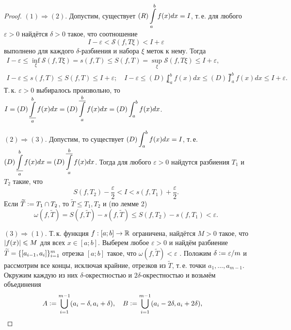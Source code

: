 \begin{proof}
    $(1) \Rightarrow (2)$. Допустим, существует $\displaystyle (R)\int\limits_a^bf(x)dx = I$, т.\,е. для любого $\varepsilon > 0$ найдётся $\delta > 0$ такое, что соотношение
    \[
        I - \varepsilon < \mathcal{S}(f, T\xi) < I + \varepsilon
    \]
    выполнено для каждого $\delta$-разбиения и набора $\xi$ меток к нему. Тогда
    \begin{gather*}
        I - \varepsilon \leqslant \inf\limits_\xi\mathcal{S}(f, T\xi) = s(f, T) \leqslant S(f, T) = \sup\limits_\xi\mathcal{S}(f, T\xi) \leqslant I + \varepsilon,\\
        I - \varepsilon \leqslant s(f, T) \leqslant S(f, T) \leqslant I + \varepsilon;\quad
        I - \varepsilon \leqslant (D)\lowint_a^bf(x)dx \leqslant (D)\upint_a^bf(x)dx \leqslant I + \varepsilon.
    \end{gather*}
    Т.\,к. $\varepsilon > 0$ выбиралось произвольно, то $\displaystyle I = (D)\operatorname*{\underline{\int}}_a^bf(x)dx = (D)\operatorname*{\overline{\int}}_a^bf(x)dx = (D)\int_a^bf(x)dx$.

    $(2) \Rightarrow (3)$. Допустим, то существует $\displaystyle (D)\int_a^bf(x)dx = I$, т.\,е. $\displaystyle (D)\operatorname*{\underline{\int}}_a^bf(x)dx = (D)\operatorname*{\overline{\int}}_a^bf(x)dx$. Тогда для любого $\varepsilon > 0$ найдутся разбиения $T_1$ и $T_2$ такие, что
    \[
        S(f, T_2) - \frac{\varepsilon}{2} < I < s(f, T_1) + \frac{\varepsilon}{2}.
    \]
    Если $\widetilde{T} \vcentcolon = T_1 \cap T_2$, то $\widetilde{T} \leqslant T_1, T_2$ и (по лемме 2)
    \[
        \omega(f, \widetilde{T}) = S(f, \widetilde{T}) - s(f, \widetilde{T}) \leqslant S(f, T_2) - s(f, T_1) < \varepsilon.
    \]

    $(3) \Rightarrow (1)$. Т.\,к. функция $f: [a; b] \to \mathbb{R}$ ограничена, найдётся $M > 0$ такое, что $\left\lvert f(x)\right\rvert \leqslant M$ для всех $x \in [a; b]$. Выберем любое $\varepsilon > 0$ и найдём разбиение $\widetilde{T} = \{\left[a_{i - 1}, a_i\right]\}_{i = 1}^m$ отрезка $[a; b]$ такое, что $\omega(f, \widetilde{T}) < \varepsilon$ . Положим $\delta \vcentcolon = \varepsilon / m$ и рассмотрим все концы, исключая крайние, отрезков из $\widetilde{T}$, т.\,е. точки $a_1, \ldots, a_{m - 1}$. Окружим каждую из них $\delta$-окрестностью и $2\delta$-окрестностью и возьмём объединения
    \[
        A \vcentcolon = \bigcup_{i = 1}^{m - 1}(a_i - \delta, a_i + \delta),\quad
        B \vcentcolon = \bigcup_{i = 1}^{m - 1}(a_i - 2\delta, a_i + 2\delta),\quad
    \]


\end{proof}
